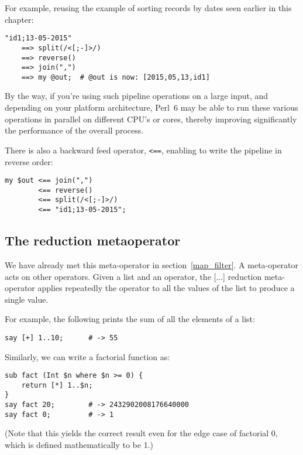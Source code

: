 For example, reusing the example of sorting records 
by dates seen earlier in this chapter:

\begin{verbatim}
"id1;13-05-2015" 
    ==> split(/<[;-]>/) 
    ==> reverse() 
    ==> join(",") 
    ==> my @out;  # @out is now: [2015,05,13,id1]
\end{verbatim}

By the way, if you're using such pipeline operations on 
a large input, and depending on your platform 
architecture, Perl~6 may be able to run these 
various operations in parallel on different CPU's or cores, 
thereby improving significantly the performance 
of the overall process.

There is also a backward feed operator, \verb'<==', 
enabling to write the pipeline in reverse order:

\begin{verbatim}
my $out <== join(",") 
        <== reverse() 
        <== split(/<[;-]>/) 
        <== "id1;13-05-2015";
\end{verbatim}


\subsection{The reduction metaoperator}

We have already met this meta-operator in section~\ref{map_filter}. 
A meta-operator acts on other operators. Given 
a list and an operator, the [...] reduction meta-operator 
applies repeatedly the operator to all the values of the
list to produce a single value.

For example, the following prints the sum of all the 
elements of a list:

\begin{verbatim}
say [+] 1..10;      # -> 55
\end{verbatim}

Similarly, we can write a factorial function as:

\begin{verbatim}
sub fact (Int $n where $n >= 0) {
    return [*] 1..$n;
}
say fact 20;        # -> 2432902008176640000
say fact 0;         # -> 1
\end{verbatim}

(Note that this yields the correct result even for the 
edge case of factorial 0, which is defined mathematically 
to be 1.)

